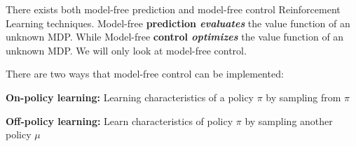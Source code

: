 There exists both model-free prediction and model-free control Reinforcement Learning techniques.
Model-free \textbf{prediction \textit{evaluates}} the value function of an unknown MDP.
While Model-free \textbf{control \textit{optimizes}} the value function of an unknown MDP.
We will only look at model-free control.

There are two ways that model-free control can be implemented:

\textbf{On-policy learning:}
Learning characteristics of a policy $\pi$ by sampling from $\pi$

\textbf{Off-policy learning:}
Learn characteristics of policy $\pi$ by sampling another policy $\mu$